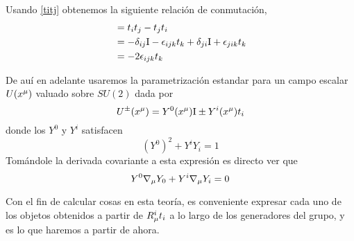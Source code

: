 Usando \eqref{titj} obtenemos la siguiente relación de conmutación,
\begin{align}
  [t_i,t_j]&=t_it_j-t_jt_i\\
  &=-\d_{ij}\id -\epsilon_{ijk}t_k+\d_{ji}\id +\epsilon_{jik}t_k\\
  &=-2\epsilon_{ijk}t_k\label{[titj]}
\end{align}

De auí en adelante usaremos la parametrización estandar para un campo escalar $U(x^\mu )$ valuado sobre $SU(2)$ dada por
\begin{equation}\label{U}
  U^{\pm }(x^\mu )=Y^0(x^\mu )\mathrm{I} \pm Y^{i}(x^\mu )t_i
\end{equation}
donde los $Y^0$ y $Y^{i}$ satisfacen
\begin{equation}
  (Y^0)^2+Y^{i}Y_i=1
\end{equation}
Tomándole la derivada covariante a esta expresión es directo ver que
\begin{equation}\label{ydy0}
  Y^0\nabla_\mu Y_0+Y^{i}\nabla_\mu Y_i=0
\end{equation}

Con el fin de calcular cosas en esta teoría, es conveniente expresar cada uno de los objetos obtenidos a partir de $R_\mu^{i}t_i$ a lo largo de los generadores del grupo, y es lo que haremos a partir de ahora.


